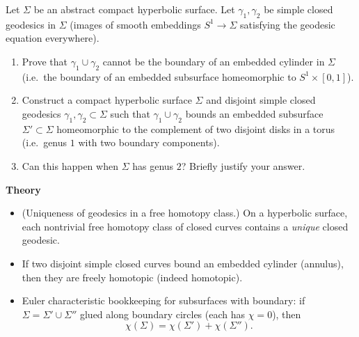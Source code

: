 \begin{problem}
\label{prob:cp-vii-0088}
Let $\Sigma$ be an abstract compact hyperbolic surface.
Let $\gamma_1,\gamma_2$ be simple closed geodesics in $\Sigma$ (images of smooth embeddings $S^1\to\Sigma$
satisfying the geodesic equation everywhere).

\begin{enumerate}
	
	\item Prove that $\gamma_1\cup\gamma_2$ cannot be the boundary of an embedded cylinder in $\Sigma$
	(i.e.\ the boundary of an embedded subsurface homeomorphic to $S^1\times[0,1]$).
	\item Construct a compact hyperbolic surface $\Sigma$ and disjoint simple closed geodesics $\gamma_1,\gamma_2\subset \Sigma$
	such that $\gamma_1\cup\gamma_2$ bounds an embedded subsurface $\Sigma'\subset \Sigma$ homeomorphic to the complement
	of two disjoint disks in a torus (i.e.\ genus $1$ with two boundary components).
	\item Can this happen when $\Sigma$ has genus $2$? Briefly justify your answer.
\end{enumerate}

\par\medskip\noindent\textbf{Theory}\par\smallskip

\begin{itemize}
	\item (Uniqueness of geodesics in a free homotopy class.)
	On a hyperbolic surface, each nontrivial free homotopy class of closed curves contains a \emph{unique} closed geodesic.
	\item If two disjoint simple closed curves bound an embedded cylinder (annulus), then they are freely homotopic (indeed homotopic).
	\item Euler characteristic bookkeeping for subsurfaces with boundary:
	if $\Sigma=\Sigma'\cup \Sigma''$ glued along boundary circles (each has $\chi=0$), then
	\[
	\chi(\Sigma)=\chi(\Sigma')+\chi(\Sigma'').
	\]
\end{itemize}
\end{problem}

